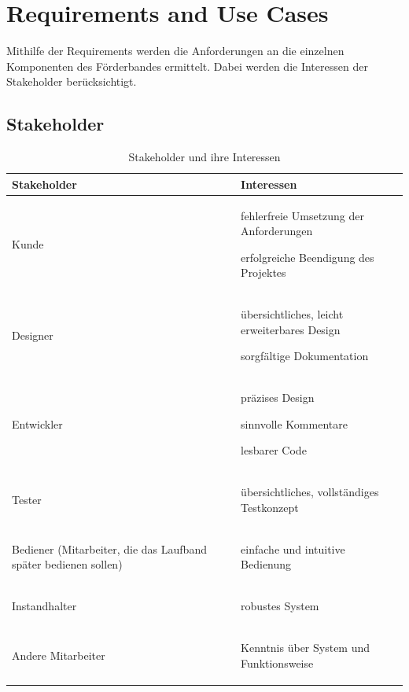 \documentclass[a4paper, 11pt]{article}
\begin{document}
\section{Requirements and Use Cases}
Mithilfe der Requirements werden die Anforderungen an die einzelnen Komponenten des Förderbandes ermittelt. Dabei werden die Interessen der Stakeholder berücksichtigt.
\subsection{Stakeholder}
\begin{table}[h]
\center
\begin{tabularx}{\textwidth}{|X|X|}
\hline
\textbf{Stakeholder}&\textbf{Interessen}\\
\hline
Kunde&\begin{compactenum}[-]
      \item fehlerfreie Umsetzung der Anforderungen
      \item erfolgreiche Beendigung des Projektes 
      \end{compactenum}\\
\hline
Designer&\begin{compactenum}[-]
         \item übersichtliches, leicht erweiterbares Design
         \item sorgfältige Dokumentation 
         \end{compactenum}\\ 
\hline
Entwickler&\begin{compactenum}[-]
           \item präzises Design
           \item sinnvolle Kommentare
           \item lesbarer Code 
           \end{compactenum}\\
\hline
Tester&\begin{compactenum}[-]
       \item übersichtliches, vollständiges Testkonzept 
       \end{compactenum}\\
\hline
Bediener (Mitarbeiter, die das Laufband später bedienen sollen)&\begin{compactenum}[-]
\item einfache und intuitive Bedienung
\end{compactenum}\\
\hline
Instandhalter&\begin{compactenum}[-]
              \item robustes System
              \end{compactenum}\\
\hline
Andere Mitarbeiter&\begin{compactenum}[-]
                   \item Kenntnis über System und Funktionsweise
                   \end{compactenum}\\
\hline
\end{tabularx}
\caption{Stakeholder und ihre Interessen}
\label{stake}
\end{table}
\end{document}
